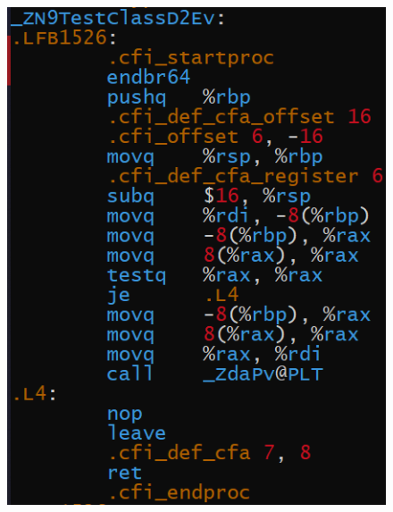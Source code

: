 \documentclass[a4paper,12pt]{article}
\begin{document}
\begin{figure}[H]
{\begin{minipage}[t]{0.55\textwidth}
        \includegraphics[scale = 0.63]{Деструктор.png}
    \end{minipage}}
\end{figure}
\newpage  
\end{document}
